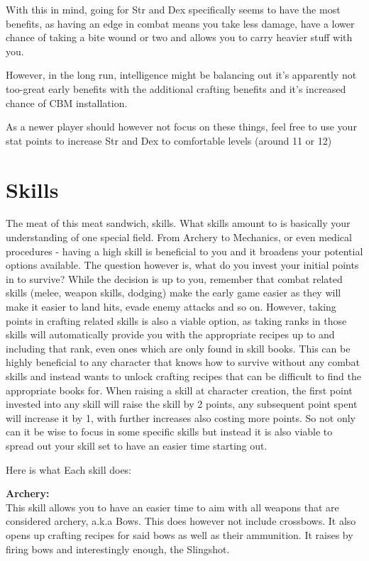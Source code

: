 \documentclass[11pt]{report}
\begin{document}
With this in mind, going for Str and Dex specifically seems to have the most benefits, as having an edge in combat means you take less damage, have a lower chance of taking a bite wound or two and allows you to carry heavier stuff with you.

However, in the long run, intelligence might be balancing out it's apparently not too-great early benefits with the additional crafting benefits and it's increased chance of CBM installation.

As a newer player should however not focus on these things, feel free to use your stat points to increase Str and Dex to comfortable levels (around 11 or 12)

\section{Skills}

The meat of this meat sandwich, skills. What skills amount to is basically your understanding of one special field. From Archery to Mechanics, or even medical procedures - having a high skill is beneficial to you and it broadens your potential options available. The question however is, what do you invest your initial points in to survive? While the decision is up to you, remember that combat related skills (melee, weapon skills, dodging) make the early game easier as they will make it easier to land hits, evade enemy attacks and so on. However, taking points in crafting related skills is also a viable option, as taking ranks in those skills will automatically provide you with the appropriate recipes up to and including that rank, even ones which are only found in skill books. This can be highly beneficial to any character that knows how to survive without any combat skills and instead wants to unlock crafting recipes that can be difficult to find the appropriate books for. When raising a skill at character creation, the first point invested into any skill will raise the skill by 2 points, any subsequent point spent will increase it by 1, with further increases also costing more points. So not only can it be wise to focus in some specific skills but instead it is also viable to spread out your skill set to have an easier time starting out.

Here is what Each skill does:

\textbf{Archery:}\\This skill allows you to have an easier time to aim with all weapons that are considered archery, a.k.a Bows. This does however not include crossbows. It also opens up crafting recipes for said bows as well as their ammunition. It raises by firing bows and interestingly enough, the Slingshot.
\end{document}
